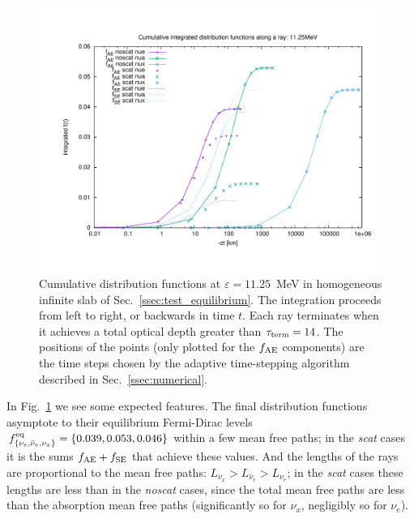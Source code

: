 \documentclass[aps,floatfix,prd,superscriptaddress,twocolumn]{revtex4-1}
\begin{document}
\begin{figure}
  \includegraphics[width=\columnwidth]{fig-cumulative_f-homogeneous}
  \caption{Cumulative distribution functions at $\varepsilon=11.25$~MeV
    in homogeneous infinite slab of Sec.~\ref{ssec:test_equilibrium}.
    The integration proceeds from left to right, or backwards in time $t$.
    Each ray terminates when it achieves a total optical depth
    greater than $\tau_{\rm term}=14$.
    The positions of the points (only plotted for the $f_{\rm AE}$ components)
    are the time steps chosen by the adaptive time-stepping algorithm
    described in Sec.~\ref{ssec:numerical}.
  }
  \label{fig:cumulative_f_homogeneous}
\end{figure}

In Fig.~\ref{fig:cumulative_f_homogeneous} we see some expected features.
The final distribution functions asymptote to their equilibrium Fermi-Dirac
levels $f^{\rm eq}_{\{\nu_e,\bar{\nu}_e,\nu_x\}}=\{0.039, 0.053, 0.046\}$
within a few mean free paths;
in the \emph{scat} cases it is the sums $f_{\rm AE}+f_{\rm SE}$ that
achieve these values.
And the lengths of the rays are proportional to the mean free paths:
$L_{\nu_x}>L_{\bar{\nu}_e}>L_{\nu_e}$;
in the \emph{scat} cases these lengths are less than in the \emph{noscat} cases,
since the total mean free paths are less than the absorption mean free paths
(significantly so for $\nu_x$, negligibly so for $\nu_e$).
\end{document}
